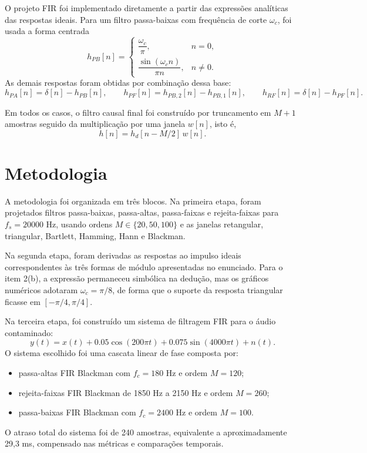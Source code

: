 \documentclass[12pt,a4paper]{article}
\begin{document}
O projeto FIR foi implementado diretamente a partir das expressões analíticas das respostas ideais. Para um filtro passa-baixas com frequência de corte $\omega_c$, foi usada a forma centrada
\[
h_{PB}[n] =
\begin{cases}
\dfrac{\omega_c}{\pi}, & n = 0,\\[4pt]
\dfrac{\sin(\omega_c n)}{\pi n}, & n \neq 0.
\end{cases}
\]
As demais respostas foram obtidas por combinação dessa base:
\[
h_{PA}[n] = \delta[n] - h_{PB}[n], \qquad
h_{PF}[n] = h_{PB,2}[n] - h_{PB,1}[n], \qquad
h_{RF}[n] = \delta[n] - h_{PF}[n].
\]

Em todos os casos, o filtro causal final foi construído por truncamento em $M+1$ amostras seguido da multiplicação por uma janela $w[n]$, isto é,
\[
h[n] = h_d[n - M/2]\,w[n].
\]

\section*{Metodologia}
A metodologia foi organizada em três blocos. Na primeira etapa, foram projetados filtros passa-baixas, passa-altas, passa-faixas e rejeita-faixas para $f_s = 20000$ Hz, usando ordens $M \in \{20, 50, 100\}$ e as janelas retangular, triangular, Bartlett, Hamming, Hann e Blackman.

Na segunda etapa, foram derivadas as respostas ao impulso ideais correspondentes às três formas de módulo apresentadas no enunciado. Para o item 2(b), a expressão permaneceu simbólica na dedução, mas os gráficos numéricos adotaram $\omega_c = \pi/8$, de forma que o suporte da resposta triangular ficasse em $[-\pi/4, \pi/4]$.

Na terceira etapa, foi construído um sistema de filtragem FIR para o áudio contaminado:
\[
y(t) = x(t) + 0.05\cos(200\pi t) + 0.075\sin(4000\pi t) + n(t).
\]
O sistema escolhido foi uma cascata linear de fase composta por:
\begin{itemize}
    \item passa-altas FIR Blackman com $f_c = 180$ Hz e ordem $M = 120$;
    \item rejeita-faixas FIR Blackman de 1850 Hz a 2150 Hz e ordem $M = 260$;
    \item passa-baixas FIR Blackman com $f_c = 2400$ Hz e ordem $M = 100$.
\end{itemize}
O atraso total do sistema foi de 240 amostras, equivalente a aproximadamente 29,3 ms, compensado nas métricas e comparações temporais.
\end{document}
